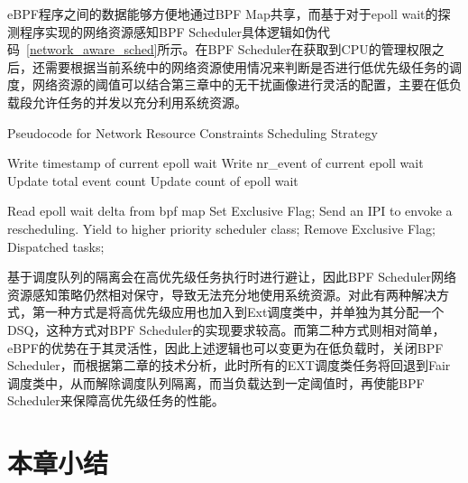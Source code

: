 eBPF程序之间的数据能够方便地通过BPF Map共享，而基于对于epoll wait的探测程序实现的网络资源感知BPF Scheduler具体逻辑如伪代码~\ref{network_aware_sched}所示。在BPF Scheduler在获取到CPU的管理权限之后，还需要根据当前系统中的网络资源使用情况来判断是否进行低优先级任务的调度，网络资源的阈值可以结合第三章中的无干扰画像进行灵活的配置，主要在低负载段允许任务的并发以充分利用系统资源。


\begin{algorithm}
    \caption{Pseudocode for Network Resource Constraints Scheduling Strategy}
    \label{alg:network_aware_sched}
    \begin{algorithmic}[1]

        \State Write timestamp of current epoll wait
        \State Write nr\_event of current epoll wait
        \State Update total event count
        \State Update count of epoll wait
    \EndFunction

            \State Read epoll wait delta from bpf map
                \State Set Exclusive Flag;
                    \State Send an IPI to envoke a rescheduling.
                \EndFor
                \State Yield to higher priority scheduler class;
            \EndIf
            \State Remove Exclusive Flag;
            \State Dispatched tasks;
        \EndWhile
    \EndFunction
    \end{algorithmic}
\end{algorithm}

基于调度队列的隔离会在高优先级任务执行时进行避让，因此BPF Scheduler网络资源感知策略仍然相对保守，导致无法充分地使用系统资源。对此有两种解决方式，第一种方式是将高优先级应用也加入到Ext调度类中，并单独为其分配一个DSQ，这种方式对BPF Scheduler的实现要求较高。而第二种方式则相对简单，eBPF的优势在于其灵活性，因此上述逻辑也可以变更为在低负载时，关闭BPF Scheduler，而根据第二章的技术分析，此时所有的EXT调度类任务将回退到Fair调度类中，从而解除调度队列隔离，而当负载达到一定阈值时，再使能BPF Scheduler来保障高优先级任务的性能。


\section{本章小结}

